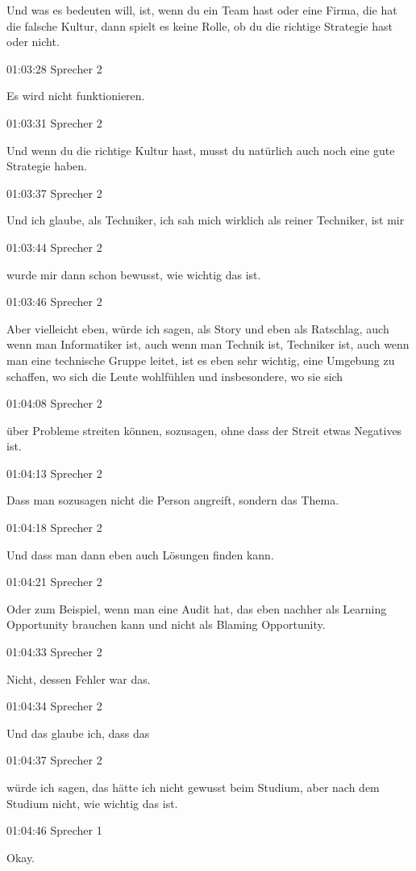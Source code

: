 Und was es bedeuten will, ist, wenn du ein Team hast oder eine Firma,
die hat die falsche Kultur, dann spielt es keine Rolle, ob du die
richtige Strategie hast oder nicht.

01:03:28 Sprecher 2

Es wird nicht funktionieren.

01:03:31 Sprecher 2

Und wenn du die richtige Kultur hast, musst du natürlich auch noch eine
gute Strategie haben.

01:03:37 Sprecher 2

Und ich glaube, als Techniker, ich sah mich wirklich als reiner
Techniker, ist mir

01:03:44 Sprecher 2

wurde mir dann schon bewusst, wie wichtig das ist.

01:03:46 Sprecher 2

Aber vielleicht eben, würde ich sagen, als Story und eben als Ratschlag,
auch wenn man Informatiker ist, auch wenn man Technik ist, Techniker
ist, auch wenn man eine technische Gruppe leitet, ist es eben sehr
wichtig, eine Umgebung zu schaffen, wo sich die Leute wohlfühlen und
insbesondere, wo sie sich

01:04:08 Sprecher 2

über Probleme streiten können, sozusagen, ohne dass der Streit etwas
Negatives ist.

01:04:13 Sprecher 2

Dass man sozusagen nicht die Person angreift, sondern das Thema.

01:04:18 Sprecher 2

Und dass man dann eben auch Lösungen finden kann.

01:04:21 Sprecher 2

Oder zum Beispiel, wenn man eine Audit hat, das eben nachher als
Learning Opportunity brauchen kann und nicht als Blaming Opportunity.

01:04:33 Sprecher 2

Nicht, dessen Fehler war das.

01:04:34 Sprecher 2

Und das glaube ich, dass das

01:04:37 Sprecher 2

würde ich sagen, das hätte ich nicht gewusst beim Studium, aber nach dem
Studium nicht, wie wichtig das ist.

01:04:46 Sprecher 1

Okay.

